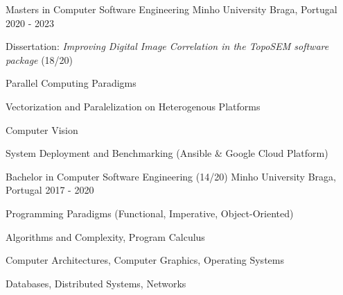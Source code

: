 
\begin{cventries}


\cventry
{Masters in Computer Software Engineering} %
{Minho University} %
{Braga, Portugal} %
{2020 - 2023} %
{ %
\begin{cvitems}
\item{Dissertation: \textit{Improving Digital Image Correlation in the TopoSEM software package} (18/20)}
\item{Parallel Computing Paradigms}
\item{Vectorization and Paralelization on Heterogenous Platforms}
\item{Computer Vision}
\item{System Deployment and Benchmarking (Ansible \& Google Cloud Platform)}
\end{cvitems}
}


\cventry
  {Bachelor in Computer Software Engineering (14/20)} %
{Minho University} %
{Braga, Portugal} %
{2017 - 2020} %
{ %
\begin{cvitems}
\item{Programming Paradigms (Functional, Imperative, Object-Oriented)}
\item{Algorithms and Complexity, Program Calculus}
\item{Computer Architectures, Computer Graphics, Operating Systems}
\item{Databases, Distributed Systems, Networks}
\end{cvitems}
}



\end{cventries}
